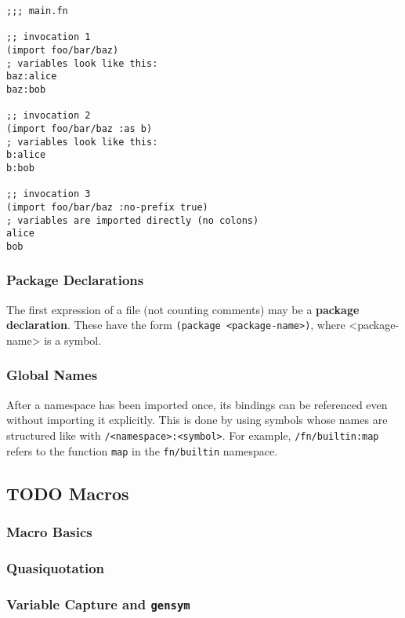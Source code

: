 \documentclass[11pt]{article}
\begin{document}
\begin{verbatim}
;;; main.fn

;; invocation 1
(import foo/bar/baz)
; variables look like this:
baz:alice
baz:bob

;; invocation 2
(import foo/bar/baz :as b)
; variables look like this:
b:alice
b:bob

;; invocation 3
(import foo/bar/baz :no-prefix true)
; variables are imported directly (no colons)
alice
bob
\end{verbatim}


\subsubsection{Package Declarations}
\label{sec:orgb5d06fc}

The first expression of a file (not counting comments) may be a \textbf{package
declaration}. These have the form \texttt{(package <package-name>)}, where <package-name>
is a symbol.


\subsubsection{Global Names}
\label{sec:org3673a57}

After a namespace has been imported once, its bindings can be referenced even
without importing it explicitly. This is done by using symbols whose names are
structured like with \texttt{/<namespace>:<symbol>}. For example, \texttt{/fn/builtin:map}
refers to the function \texttt{map} in the \texttt{fn/builtin} namespace.


\subsection{{\bfseries\sffamily TODO} Macros}
\label{sec:org725e1c4}

\subsubsection{Macro Basics}
\label{sec:org73c1c41}

\subsubsection{Quasiquotation}
\label{sec:orgb06d932}

\subsubsection{Variable Capture and \texttt{gensym}}
\label{sec:orgf78a814}
\end{document}
